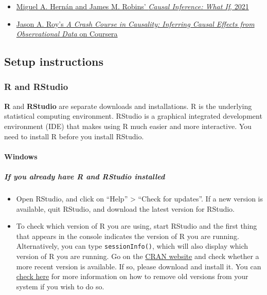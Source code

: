 \documentclass[12pt, krantz2,]{krantz}
\providecommand{\tightlist}{%
  \setlength{\itemsep}{0pt}\setlength{\parskip}{0pt}}
\let\oldparagraph\paragraph
\renewcommand{\paragraph}[1]{\oldparagraph{#1}\mbox{}}
\let\oldsubparagraph\subparagraph
\renewcommand{\subparagraph}[1]{\oldsubparagraph{#1}\mbox{}}
\theoremstyle{definition}
\theoremstyle{definition}
\theoremstyle{definition}
\newcommand{\1}{\mathbbm{1}}
\begin{document}
\begin{itemize}
\tightlist
\item
  \href{https://www.hsph.harvard.edu/miguel-hernan/causal-inference-book/}{Miguel A. Hernán and James M. Robins' \emph{Causal Inference: What If},
  2021}
\item
  \href{https://www.coursera.org/learn/crash-course-in-causality}{Jason A. Roy's \emph{A Crash Course in Causality: Inferring Causal Effects from
  Observational Data} on
  Coursera}
\end{itemize}

\hypertarget{setup}{%
\subsection{Setup instructions}\label{setup}}

\hypertarget{r-and-rstudio}{%
\subsubsection{R and RStudio}\label{r-and-rstudio}}

\textbf{R} and \textbf{RStudio} are separate downloads and installations. R is the
underlying statistical computing environment. RStudio is a graphical integrated
development environment (IDE) that makes using R much easier and more
interactive. You need to install R before you install RStudio.

\hypertarget{windows}{%
\paragraph{Windows}\label{windows}}

\hypertarget{if-you-already-have-r-and-rstudio-installed}{%
\subparagraph{If you already have R and RStudio installed}\label{if-you-already-have-r-and-rstudio-installed}}

\begin{itemize}
\tightlist
\item
  Open RStudio, and click on ``Help'' \textgreater{} ``Check for updates''. If a new version is
  available, quit RStudio, and download the latest version for RStudio.
\item
  To check which version of R you are using, start RStudio and the first thing
  that appears in the console indicates the version of R you are
  running. Alternatively, you can type \texttt{sessionInfo()}, which will also display
  which version of R you are running. Go on the \href{https://cran.r-project.org/bin/windows/base/}{CRAN
  website} and check whether a
  more recent version is available. If so, please download and install it. You
  can \href{https://cran.r-project.org/bin/windows/base/rw-FAQ.html\#How-do-I-UNinstall-R_003f}{check here}
  for more information on how to remove old versions from your system if you
  wish to do so.
\end{itemize}
\end{document}
